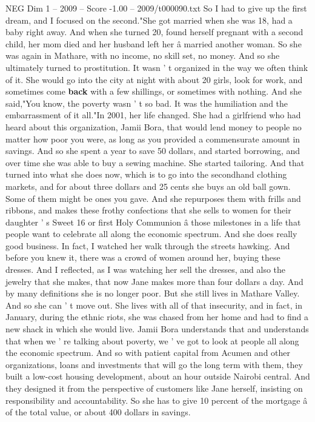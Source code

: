 \begin{textsample}{NEG Dim 1 – 2009 – Score -1.00 – 2009/t000090.txt}
So I had to give up the first dream, and I focused on the second."She got married when she was 18, had a baby right away.
And when she turned 20, found herself pregnant with a second child, her mom died and her husband left her â married another woman.
So she was again in Mathare, with no income, no skill set, no money.
And so she ultimately turned to prostitution.
It wasn ' t organized in the way we often think of it.
She would go into the city at night with about 20 girls, look for work, and sometimes come \textbf{back} with a few shillings, or sometimes with nothing.
And she said,"You know, the poverty wasn ' t so bad.
It was the humiliation and the embarrassment of it all."In 2001, her life changed.
She had a girlfriend who had heard about this organization, Jamii Bora, that would lend money to people no matter how poor you were, as long as you provided a commensurate amount in savings.
And so she spent a year to save 50 dollars, and started borrowing, and over time she was able to buy a sewing machine.
She started tailoring.
And that turned into what she does now, which is to go into the secondhand clothing markets, and for about three dollars and 25 cents she buys an old ball gown.
Some of them might be ones you gave.
And she repurposes them with frills and ribbons, and makes these frothy confections that she sells to women for their daughter ' s Sweet 16 or first Holy Communion â those milestones in a life that people want to celebrate all along the economic spectrum.
And she does really good business.
In fact, I watched her walk through the streets hawking.
And before you knew it, there was a crowd of women around her, buying these dresses.
And I reflected, as I was watching her sell the dresses, and also the jewelry that she makes, that now Jane makes more than four dollars a day.
And by many definitions she is no longer poor.
But she still lives in Mathare Valley.
And so she can ' t move out.
She lives with all of that insecurity, and in fact, in January, during the ethnic riots, she was chased from her home and had to find a new shack in which she would live.
Jamii Bora understands that and understands that when we ' re talking about poverty, we ' ve got to look at people all along the economic spectrum.
And so with patient capital from Acumen and other organizations, loans and investments that will go the long term with them, they built a low-cost housing development, about an hour outside Nairobi central.
And they designed it from the perspective of customers like Jane herself, insisting on responsibility and accountability.
So she has to give 10 percent of the mortgage â of the total value, or about 400 dollars in savings.

\end{textsample}
